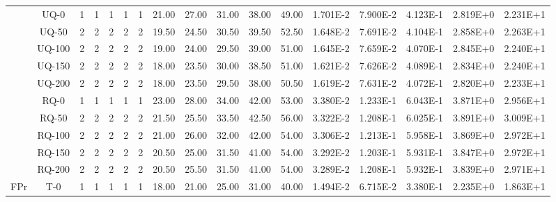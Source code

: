 \begin{table}[ht]
\begin{center}
{\begin{tabular}{cc|c|c|c|c|c|c|c|c|c|c|c|c|c|c|c|}
\cline{2-17}																														
\multicolumn{1}{|c|}{}                      & \multicolumn{1}{|c|}{UQ-0} &	1	&	1	&	1	&	1	&	1	&	21.00	&	27.00	&	31.00	&	38.00	&	49.00	&	1.701E-2	&	7.900E-2	&	4.123E-1	&	2.819E+0	&	2.231E+1	\\
\multicolumn{1}{|c|}{}                      & \multicolumn{1}{|c|}{UQ-50} &	2	&	2	&	2	&	2	&	2	&	19.50	&	24.50	&	30.50	&	39.50	&	52.50	&	1.648E-2	&	7.691E-2	&	4.104E-1	&	2.858E+0	&	2.263E+1	\\
\multicolumn{1}{|c|}{}                      & \multicolumn{1}{|c|}{UQ-100} &	2	&	2	&	2	&	2	&	2	&	19.00	&	24.00	&	29.50	&	39.00	&	51.00	&	1.645E-2	&	7.659E-2	&	4.070E-1	&	2.845E+0	&	2.240E+1	\\
\multicolumn{1}{|c|}{}                      & \multicolumn{1}{|c|}{UQ-150} &	2	&	2	&	2	&	2	&	2	&	18.00	&	23.50	&	30.00	&	38.50	&	51.00	&	1.621E-2	&	7.626E-2	&	4.089E-1	&	2.834E+0	&	2.240E+1	\\
\multicolumn{1}{|c|}{}                      & \multicolumn{1}{|c|}{UQ-200} &	2	&	2	&	2	&	2	&	2	&	18.00	&	23.50	&	29.50	&	38.00	&	50.50	&	1.619E-2	&	7.631E-2	&	4.072E-1	&	2.820E+0	&	2.233E+1	\\
\cline{2-17}																														
\multicolumn{1}{|c|}{}                      & \multicolumn{1}{|c|}{RQ-0} &	1	&	1	&	1	&	1	&	1	&	23.00	&	28.00	&	34.00	&	42.00	&	53.00	&	3.380E-2	&	1.233E-1	&	6.043E-1	&	3.871E+0	&	2.956E+1	\\
\multicolumn{1}{|c|}{}                      & \multicolumn{1}{|c|}{RQ-50} & 	2	&	2	&	2	&	2	&	2	&	21.50	&	25.50	&	33.50	&	42.50	&	56.00	&	3.322E-2	&	1.208E-1	&	6.025E-1	&	3.891E+0	&	3.009E+1	\\
\multicolumn{1}{|c|}{}                      & \multicolumn{1}{|c|}{RQ-100} &	2	&	2	&	2	&	2	&	2	&	21.00	&	26.00	&	32.00	&	42.00	&	54.00	&	3.306E-2	&	1.213E-1	&	5.958E-1	&	3.869E+0	&	2.972E+1	\\
\multicolumn{1}{|c|}{}                      & \multicolumn{1}{|c|}{RQ-150} &	2	&	2	&	2	&	2	&	2	&	20.50	&	25.00	&	31.50	&	41.00	&	54.00	&	3.292E-2	&	1.203E-1	&	5.931E-1	&	3.847E+0	&	2.972E+1	\\
\multicolumn{1}{|c|}{}                      & \multicolumn{1}{|c|}{RQ-200} & 	2	&	2	&	2	&	2	&	2	&	20.50	&	25.50	&	31.50	&	41.00	&	54.00	&	3.289E-2	&	1.208E-1	&	5.932E-1	&	3.839E+0	&	2.971E+1	\\
\cline{1-17}																														
\multicolumn{1}{|c|}{\multirow{15}{*}{FPr}} & \multicolumn{1}{|c|}{T-0} & 	1	&	1	&	1	&	1	&	1	&	18.00	&	21.00	&	25.00	&	31.00	&	40.00	&	1.494E-2	&	6.715E-2	&	3.380E-1	&	2.235E+0	&	1.863E+1	\\

\end{tabular}}
\end{center}
\end{table}
